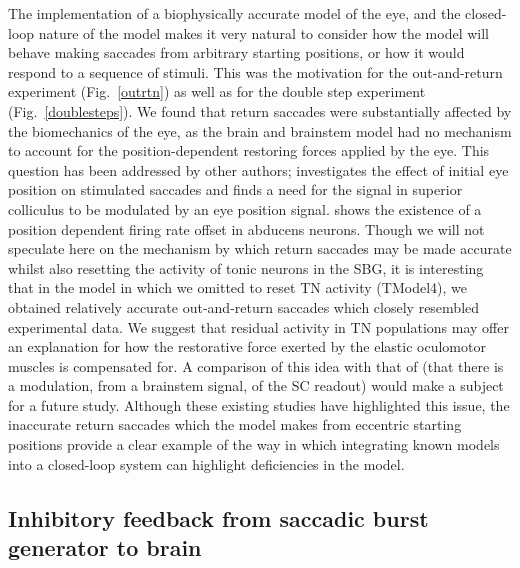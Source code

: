 The implementation of a biophysically accurate model of the eye, and
the closed-loop nature of the model makes it very natural to consider
how the model will behave making saccades from arbitrary starting
positions, or how it would respond to a sequence of stimuli. This was
the motivation for the out-and-return experiment (Fig.~\ref{outrtn})
as well as for the double step experiment (Fig.~\ref{doublesteps}).
We found that return saccades were substantially affected by the
biomechanics of the eye, as the brain and brainstem model had no
mechanism to account for the position-dependent restoring forces applied
by the eye. This question has been addressed by other authors;
\cite{groh_effects_2011} investigates the effect of
initial eye position on stimulated saccades
and finds a need for the signal in superior colliculus to be modulated
by an eye position signal. \cite{ling_effects_2007} shows the existence
of a position dependent firing rate offset in abducens neurons. Though
we will not speculate here on the mechanism by which return saccades
may be made accurate whilst also resetting the activity of tonic
neurons in the SBG, it is interesting that in the model in which we
omitted to reset TN activity (TModel4), we obtained relatively accurate
out-and-return saccades which closely resembled experimental data.
We suggest that residual activity in TN populations may offer an
explanation for how the restorative force exerted by
the elastic oculomotor muscles is compensated for. A comparison of
this idea with that of \cite{groh_effects_2011} (that there is a
modulation, from a brainstem signal, of the SC readout) would make
a subject for a future study. Although these existing studies have
highlighted this issue, the inaccurate return saccades which the
model makes from eccentric starting positions provide a clear example
of the way in which integrating known models into a closed-loop system
can highlight deficiencies in the model.

\subsection{Inhibitory feedback from saccadic burst generator to brain}

